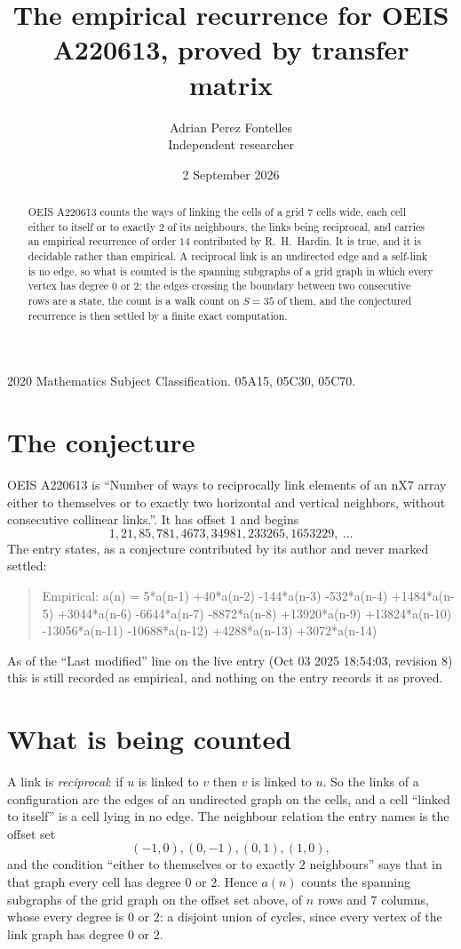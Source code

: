 \documentclass[11pt,a4paper]{article}
\title{The empirical recurrence for OEIS A220613, proved by transfer matrix}
\author{Adrian Perez Fontelles\\ \small Independent researcher}
\date{2 September 2026}
\theoremstyle{plain}
\theoremstyle{definition}
\begin{document}
\maketitle

\begin{abstract}
OEIS A220613 counts the ways of linking the cells of a grid $7$ cells wide, each cell either to
itself or to exactly $2$ of its neighbours, the links being reciprocal, and carries an
empirical recurrence of order $14$ contributed by R.~H.~Hardin. It is true, and it is
decidable rather than empirical. A reciprocal link is an undirected edge and a self-link is
no edge, so what is counted is the spanning subgraphs of a grid graph in which every vertex
has degree $0$ or $2$; the edges crossing the boundary between two consecutive rows are a
state, the count is a walk count on $S=35$ of them, and the conjectured recurrence is then
settled by a finite exact computation.
\end{abstract}

\noindent\small 2020 Mathematics Subject Classification. 05A15, 05C30, 05C70.\normalsize

\section{The conjecture}

OEIS A220613 is ``Number of ways to reciprocally link elements of an nX7 array either to themselves or to exactly two horizontal and vertical neighbors, without consecutive collinear links.''. It has offset $1$ and begins
\[
1, 21, 85, 781, 4673, 34981, 233265, 1653229,\ \dots
\]
The entry states, as a conjecture contributed by its author and never marked settled:
\begin{quote}
Empirical: a(n) = 5*a(n-1) +40*a(n-2) -144*a(n-3) -532*a(n-4) +1484*a(n-5) +3044*a(n-6) -6644*a(n-7) -8872*a(n-8) +13920*a(n-9) +13824*a(n-10) -13056*a(n-11) -10688*a(n-12) +4288*a(n-13) +3072*a(n-14)
\end{quote}
As of the ``Last modified'' line on the live entry (Oct 03 2025 18:54:03, revision 8) this is still
recorded as empirical, and nothing on the entry records it as proved.

\section{What is being counted}

A link is \emph{reciprocal}: if $u$ is linked to $v$ then $v$ is linked to $u$. So the links
of a configuration are the edges of an undirected graph on the cells, and a cell ``linked to
itself'' is a cell lying in no edge. The neighbour relation the entry names is the offset set
\[
(-1,0), (0,-1), (0,1), (1,0),
\]
and the condition ``either to themselves or to exactly $2$ neighbours'' says that in that
graph every cell has degree $0$ or $2$. Hence $a(n)$ counts the spanning subgraphs of the
grid graph on the offset set above, of $n$ rows and $7$ columns,
whose every degree is $0$ or $2$: a disjoint union of cycles, since every vertex of the link graph has degree $0$ or $2$.
\end{document}
